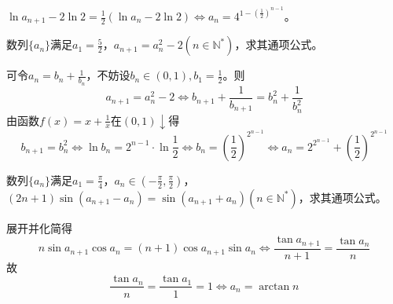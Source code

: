 \documentclass[../sample]{subfiles}
\begin{document}
$\ln a_{n+1}-2\ln 2=\frac{1}{2}(\ln a_n-2\ln 2)\Leftrightarrow a_n=4^{1-(\frac{1}{2})^{n-1}}$。

\begin{problem}
  数列$\{a_n\}$满足$a_1=\frac{5}{2}$，$a_{n+1}=a_n^2-2(n\in\mathbb{N^*})$，求其通项公式。
\end{problem}

可令$a_n=b_n+\frac{1}{b_n}$，不妨设$b_n\in (0,1), b_1=\frac{1}{2}$。则\[a_{n+1}=a_n^2-2\Leftrightarrow b_{n+1}+\frac{1}{b_{n+1}}=b_n^2+\frac{1}{b_n^2}\]
由函数$f(x)=x+\frac{1}{x}在(0, 1)\downarrow$得\[b_{n+1}=b_n^2\Leftrightarrow \ln b_n=2^{n-1}·\ln \frac{1}{2}\Leftrightarrow b_n=(\frac{1}{2})^{2^{n-1}}\Leftrightarrow a_n=2^{2^{n-1}}+(\frac{1}{2})^{2^{n-1}}\]

\begin{problem}
  数列$\{a_n\}$满足$a_1=\frac{\pi}{4}$，$ a_n\in (-\frac{\pi}{2}, \frac{\pi}{2})$，$ (2n+1)\sin(a_{n+1}-a_n)=\sin(a_{n+1}+a_n)(n\in\mathbb{N^*})$，求其通项公式。
\end{problem}

展开并化简得\[n\sin a_{n+1}\cos a_n=(n+1)\cos a_{n+1}\sin a_n\Leftrightarrow \frac{\tan a_{n+1}}{n+1}=\frac{\tan a_n}{n}\]
故\[\frac{\tan a_n}{n}=\frac{\tan a_1}{1}=1\Leftrightarrow a_n=\arctan n\]
\end{document}
